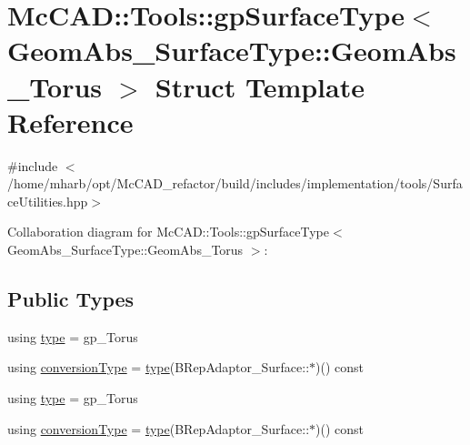 \hypertarget{structMcCAD_1_1Tools_1_1gpSurfaceType_3_01GeomAbs__SurfaceType_1_1GeomAbs__Torus_01_4}{}\section{Mc\+C\+AD\+:\+:Tools\+:\+:gp\+Surface\+Type$<$ Geom\+Abs\+\_\+\+Surface\+Type\+:\+:Geom\+Abs\+\_\+\+Torus $>$ Struct Template Reference}
\label{structMcCAD_1_1Tools_1_1gpSurfaceType_3_01GeomAbs__SurfaceType_1_1GeomAbs__Torus_01_4}


{\ttfamily \#include $<$/home/mharb/opt/\+Mc\+C\+A\+D\+\_\+refactor/build/includes/implementation/tools/\+Surface\+Utilities.\+hpp$>$}



Collaboration diagram for Mc\+C\+AD\+:\+:Tools\+:\+:gp\+Surface\+Type$<$ Geom\+Abs\+\_\+\+Surface\+Type\+:\+:Geom\+Abs\+\_\+\+Torus $>$\+:
\subsection*{Public Types}
\begin{DoxyCompactItemize}
\item 
using \hyperlink{structMcCAD_1_1Tools_1_1gpSurfaceType_3_01GeomAbs__SurfaceType_1_1GeomAbs__Torus_01_4_a462301d1d46d776f21e26368c1e8d1b7}{type} = gp\+\_\+\+Torus
\item 
using \hyperlink{structMcCAD_1_1Tools_1_1gpSurfaceType_3_01GeomAbs__SurfaceType_1_1GeomAbs__Torus_01_4_ad997fa3fbe5435cad71d40231540a40e}{conversion\+Type} = \hyperlink{structMcCAD_1_1Tools_1_1gpSurfaceType_3_01GeomAbs__SurfaceType_1_1GeomAbs__Torus_01_4_a462301d1d46d776f21e26368c1e8d1b7}{type}(B\+Rep\+Adaptor\+\_\+\+Surface\+::$\ast$)() const
\item 
using \hyperlink{structMcCAD_1_1Tools_1_1gpSurfaceType_3_01GeomAbs__SurfaceType_1_1GeomAbs__Torus_01_4_a462301d1d46d776f21e26368c1e8d1b7}{type} = gp\+\_\+\+Torus
\item 
using \hyperlink{structMcCAD_1_1Tools_1_1gpSurfaceType_3_01GeomAbs__SurfaceType_1_1GeomAbs__Torus_01_4_ad997fa3fbe5435cad71d40231540a40e}{conversion\+Type} = \hyperlink{structMcCAD_1_1Tools_1_1gpSurfaceType_3_01GeomAbs__SurfaceType_1_1GeomAbs__Torus_01_4_a462301d1d46d776f21e26368c1e8d1b7}{type}(B\+Rep\+Adaptor\+\_\+\+Surface\+::$\ast$)() const
\end{DoxyCompactItemize}
